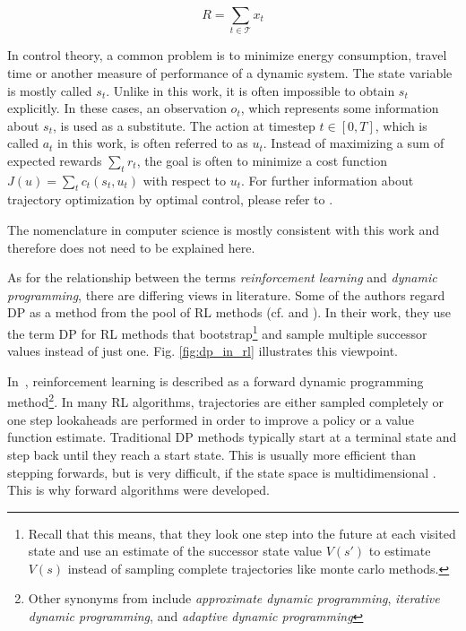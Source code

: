 \begin{equation}
R = \sum_{t\in\mathcal{T}} x_t
\label{eq:finance_resources}
\end{equation}

In control theory, a common problem is to minimize energy consumption, travel time or another measure of performance of a dynamic system. The state variable is mostly called $s_t$. Unlike in this work, it is often impossible to obtain $s_t$ explicitly. In these cases, an observation $o_t$, which represents some information about $s_t$, is used as a substitute. The action at timestep $t\in[0,T]$, which is called $a_t$ in this work, is often referred to as $u_t$. Instead of maximizing a sum of expected rewards $\sum_t r_t$, the goal is often to minimize a cost function $J(u)=\sum_t c_t(s_t,u_t)$ with respect to $u_t$. For further information about trajectory optimization by optimal control, please refer to \cite{grimm2004}.

The nomenclature in computer science is mostly consistent with this work and therefore does not need to be explained here.

As for the relationship between the terms \textit{reinforcement learning} and \textit{dynamic programming}, there are differing views in literature. Some of the authors regard DP as a method from the pool of RL methods (cf. \cite{Silver2015} and \cite{SuttonBarto2018}). In their work, they use the term DP for RL methods that bootstrap\footnote{Recall that this means, that they look one step into the future at each visited state and use an estimate of the successor state value $V(s')$ to estimate $V(s)$ instead of sampling complete trajectories like monte carlo methods.} and sample multiple successor values instead of just one. Fig. \ref{fig:dp_in_rl} illustrates this viewpoint.

In~\cite{Powell2007ADP}, reinforcement learning is described as a forward dynamic programming method\footnote{Other synonyms from \cite{Powell2007ADP} include \textit{approximate dynamic programming}, \textit{iterative dynamic programming}, and \textit{adaptive dynamic programming}}. In many RL algorithms, trajectories are either sampled completely or one step lookaheads are performed in order to improve a policy or a value function estimate. Traditional DP methods typically start at a terminal state and step back until they reach a start state. This is usually more efficient than stepping forwards, but is very difficult, if the state space is multidimensional \cite[section~1.5]{Powell2007ADP}. This is why forward algorithms were developed.

